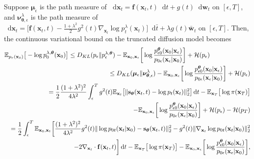 \documentclass{article}
\theoremstyle{definition}
\theoremstyle{remark}
\newcommand*\diff{\mathop{}\!\mathrm{d}}
\begin{document}
	Suppose $\bm{\mu}_{\epsilon}$ is the path measure of $\diff\mathbf{x}_{t}=\mathbf{f}(\mathbf{x}_{t},t)\diff t+g(t)\diff\mathbf{w}_{t}$ on $[\epsilon,T]$, and $\bm{\nu}_{\bm{\theta},\epsilon}^{\lambda}$ is the path measure of $\diff\mathbf{x}_{t}=\big[\mathbf{f}(\mathbf{x}_{t},t)-\frac{1+\lambda^{2}}{2}g^{2}(t)\nabla_{\mathbf{x}_{t}}\log{p_{t}^{\lambda}(\mathbf{x}_{t})}\big]\diff \bar{t}+\lambda g(t)\bar{\mathbf{w}}_{t}$ on $[\epsilon,T]$. Then, the continuous variational bound on the truncated diffusion model becomes
	\begin{eqnarray*}
		\lefteqn{\mathbb{E}_{p_{r}(\mathbf{x}_{0})}\big[-\log{p_{0}^{\lambda,\bm{\theta}}(\mathbf{x}_{0})}\big]\le D_{KL}(p_{\epsilon}\Vert p_{\epsilon}^{\lambda,\bm{\theta}})-\mathbb{E}_{\mathbf{x}_{0},\mathbf{x}_{\epsilon}}\bigg[\log{\frac{p_{\epsilon 0}^{\bm{\theta}}(\mathbf{x}_{0}\vert\mathbf{x}_{\epsilon})}{p_{0\epsilon}(\mathbf{x}_{\epsilon}\vert\mathbf{x}_{0})}}\bigg]+\mathcal{H}(p_{\epsilon})}&\\
		&&\le D_{KL}(\bm{\mu}_{\epsilon}\Vert \bm{\nu}_{\bm{\theta},\epsilon}^{\lambda})-\mathbb{E}_{\mathbf{x}_{0},\mathbf{x}_{\epsilon}}\bigg[\log{\frac{p_{\epsilon 0}^{\bm{\theta}}(\mathbf{x}_{0}\vert\mathbf{x}_{\epsilon})}{p_{0\epsilon}(\mathbf{x}_{\epsilon}\vert\mathbf{x}_{0})}}\bigg]+\mathcal{H}(p_{\epsilon})\\
		&&=\frac{1}{2}\frac{(1+\lambda^{2})^{2}}{4\lambda^{2}}\int_{\epsilon}^{T}g^{2}(t)\mathbb{E}_{\mathbf{x}_{t}}\big[\Vert\mathbf{s}_{\bm{\theta}}(\mathbf{x}_{t},t)-\log{p_{t}(\mathbf{x}_{t})}\Vert_{2}^{2}\big]\diff t-\mathbb{E}_{\mathbf{x}_{T}}\big[\log{\pi(\mathbf{x}_{T})}\big]\\
		&&\quad-\mathbb{E}_{\mathbf{x}_{0},\mathbf{x}_{\epsilon}}\bigg[\log{\frac{p_{\epsilon 0}^{\bm{\theta}}(\mathbf{x}_{0}\vert\mathbf{x}_{\epsilon})}{p_{0\epsilon}(\mathbf{x}_{\epsilon}\vert\mathbf{x}_{0})}}\bigg]+\mathcal{H}(p_{\epsilon})-\mathcal{H}(p_{T})\\
		&&=\frac{1}{2}\int_{\epsilon}^{T}\mathbb{E}_{\mathbf{x}_{0},\mathbf{x}_{t}}\bigg[\frac{(1+\lambda^{2})^{2}}{4\lambda^{2}}g^{2}(t)\Vert\log{p_{0t}(\mathbf{x}_{t}\vert\mathbf{x}_{0})}-\mathbf{s}_{\bm{\theta}}(\mathbf{x}_{t},t)\Vert_{2}^{2}-g^{2}(t)\Vert\nabla_{\mathbf{x}_{t}}\log{p_{0t}(\mathbf{x}_{t}\vert\mathbf{x}_{0})}\Vert_{2}^{2}\\
		&&\quad\quad\quad\quad\quad\quad\quad-2\nabla_{\mathbf{x}_{t}}\cdot \mathbf{f}(\mathbf{x}_{t},t)\bigg]\diff t-\mathbb{E}_{\mathbf{x}_{T}}\big[\log{\pi(\mathbf{x}_{T})}\big]-\mathbb{E}_{\mathbf{x}_{0},\mathbf{x}_{\epsilon}}\bigg[\log{\frac{p_{\epsilon 0}^{\bm{\theta}}(\mathbf{x}_{0}\vert\mathbf{x}_{\epsilon})}{p_{0\epsilon}(\mathbf{x}_{\epsilon}\vert\mathbf{x}_{0})}}\bigg],
	\end{eqnarray*}
\end{document}
